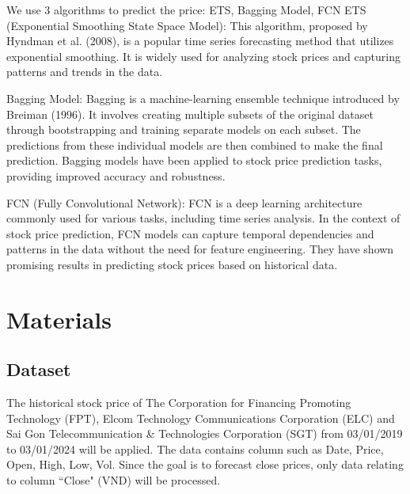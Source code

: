 \documentclass{ieeeojies}
\begin{document}
We use 3 algorithms to predict the price: ETS, Bagging Model, FCN
ETS (Exponential Smoothing State Space Model): This algorithm, proposed by Hyndman et al. (2008), is a popular time series forecasting method that utilizes exponential smoothing. It is widely used for analyzing stock prices and capturing patterns and trends in the data.

Bagging Model: Bagging is a machine-learning ensemble technique introduced by Breiman (1996). It involves creating multiple subsets of the original dataset through bootstrapping and training separate models on each subset. The predictions from these individual models are then combined to make the final prediction. Bagging models have been applied to stock price prediction tasks, providing improved accuracy and robustness.

FCN (Fully Convolutional Network): FCN is a deep learning architecture commonly used for various tasks, including time series analysis. In the context of stock price prediction, FCN models can capture temporal dependencies and patterns in the data without the need for feature engineering. They have shown promising results in predicting stock prices based on historical data.
\section{Materials}
\subsection{Dataset}

\hspace*{0.5cm}The historical stock price of The Corporation for Financing Promoting Technology (FPT), Elcom Technology Communications Corporation (ELC) and Sai Gon Telecommunication \& Technologies Corporation (SGT) from 03/01/2019 to 03/01/2024 will be applied. The data contains column such as Date, Price, Open, High, Low, Vol. Since the goal is to forecast close prices, only data relating to column “Close" (VND) will be processed.
\end{document}
